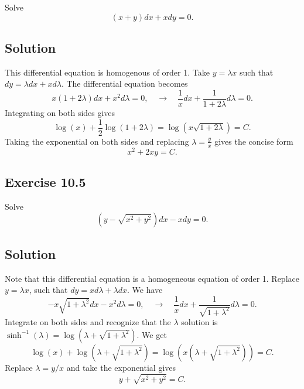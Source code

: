Solve
\begin{equation*}
    (x + y)dx + xdy = 0.
\end{equation*}

\subsection*{Solution}

This differential equation is homogenous of order 1.
Take $y = \lambda x$ such that $dy = \lambda dx + x d\lambda$.
The differential equation becomes
\begin{equation*}
    x(1 + 2\lambda) dx + x^2 d\lambda = 0, \quad \rightarrow \quad \frac{1}{x} dx + \frac{1}{1 + 2\lambda} d\lambda = 0.
\end{equation*}
Integrating on both sides gives
\begin{equation*}
    \log(x) + \frac{1}{2} \log(1 + 2\lambda) = \log(x \sqrt{1 + 2\lambda}) = C.
\end{equation*}
Taking the exponential on both sides and replacing $\lambda = \frac{y}{x}$ gives the concise form
\begin{equation*}
    x^2 + 2xy = C.
\end{equation*}


\subsection*{Exercise 10.5}

Solve
\begin{equation*}
    (y - \sqrt{x^2 + y^2})dx - xdy = 0.
\end{equation*}

\subsection*{Solution}

Note that this differential equation is a homogeneous equation of order 1.
Replace $y = \lambda x$, such that $dy = xd\lambda + \lambda dx$.
We have
\begin{equation*}
    -x\sqrt{1 + \lambda^2} dx - x^2 d\lambda = 0, \quad \rightarrow \quad \frac{1}{x} dx + \frac{1}{\sqrt{1 + \lambda^2}} d\lambda = 0.
\end{equation*}
Integrate on both sides and recognize that the $\lambda$ solution is $\sinh^{-1}(\lambda) = \log(\lambda + \sqrt{1 + \lambda^2})$.
We get
\begin{equation*}
    \log(x) + \log(\lambda + \sqrt{1 + \lambda^2}) = \log(x(\lambda + \sqrt{1 + \lambda^2})) = C.
\end{equation*}
Replace $\lambda = y/x$ and take the exponential gives
\begin{equation*}
    y + \sqrt{x^2 + y^2} = C.
\end{equation*}
